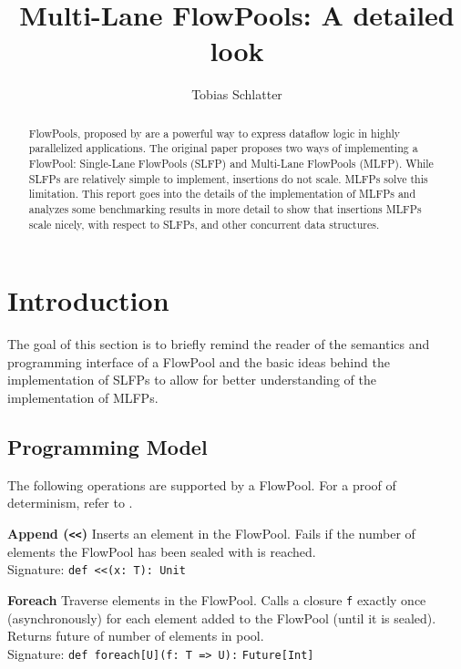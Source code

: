 \documentclass[runningheads,a4paper,fleqn]{llncs}
\begin{document}
\title{Multi-Lane FlowPools: A detailed look}
\author{Tobias Schlatter}



\maketitle

\begin{abstract}
  FlowPools, proposed by \cite{FP12} are a powerful way to express
  dataflow logic in highly parallelized applications. The original
  paper proposes two ways of implementing a FlowPool: Single-Lane
  FlowPools (SLFP) and Multi-Lane FlowPools (MLFP). While SLFPs are
  relatively simple to implement, insertions do not scale. MLFPs solve
  this limitation. This report goes into the details of the
  implementation of MLFPs and analyzes some benchmarking results in
  more detail to show that insertions MLFPs scale nicely, with respect
  to SLFPs, and other concurrent data structures.
\end{abstract}

\section{Introduction}
The goal of this section is to briefly remind the reader of the
semantics and programming interface of a FlowPool and the basic ideas
behind the implementation of SLFPs to allow for better understanding
of the implementation of MLFPs.

\subsection{Programming Model}
The following operations are supported by a FlowPool. For a proof of
determinism, refer to \cite{FP12}.

\textbf{Append (\texttt{<<})} Inserts an element in the
FlowPool. Fails if the number of elements the FlowPool has been sealed
with is reached.\\
Signature: \verb+def <<(x: T): Unit+

\textbf{Foreach} Traverse elements in the FlowPool. Calls a closure
\verb+f+ exactly once (asynchronously) for each element added to the
FlowPool (until it is sealed). Returns future of number of elements in
pool.\\
Signature: \verb+def foreach[U](f: T => U):+ \verb+Future[Int]+
\end{document}
